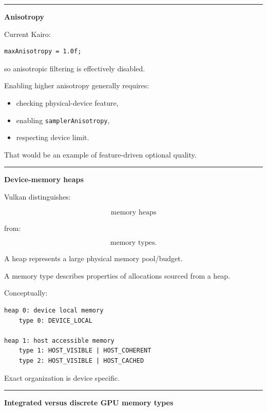 \begin{center}\rule{0.5\linewidth}{0.5pt}\end{center}

\textbf{Anisotropy}

Current Kairo:

\begin{verbatim}
maxAnisotropy = 1.0f;
\end{verbatim}

so anisotropic filtering is effectively disabled.

Enabling higher anisotropy generally requires:

\begin{itemize}
\tightlist
\item
  checking physical-device feature,
\item
  enabling \texttt{samplerAnisotropy},
\item
  respecting device limit.
\end{itemize}

That would be an example of feature-driven optional quality.

\begin{center}\rule{0.5\linewidth}{0.5pt}\end{center}

\textbf{Device-memory heaps}

Vulkan distinguishes:

\[
\boxed{
\text{memory heaps}
}
\]

from:

\[
\boxed{
\text{memory types}.
}
\]

A heap represents a large physical memory pool/budget.

A memory type describes properties of allocations sourced from a heap.

Conceptually:

\begin{verbatim}
heap 0: device local memory
    type 0: DEVICE_LOCAL

heap 1: host accessible memory
    type 1: HOST_VISIBLE | HOST_COHERENT
    type 2: HOST_VISIBLE | HOST_CACHED
\end{verbatim}

Exact organization is device specific.

\begin{center}\rule{0.5\linewidth}{0.5pt}\end{center}

\textbf{Integrated versus discrete GPU memory types}

